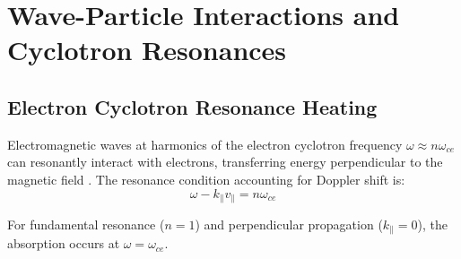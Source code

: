 \documentclass[11pt,a4paper]{article}
\begin{document}
\section{Wave-Particle Interactions and Cyclotron Resonances}

\subsection{Electron Cyclotron Resonance Heating}

Electromagnetic waves at harmonics of the electron cyclotron frequency $\omega \approx n\omega_{ce}$ can resonantly interact with electrons, transferring energy perpendicular to the magnetic field \cite{Swanson2003}. The resonance condition accounting for Doppler shift is:
\begin{equation}
\omega - k_\parallel v_\parallel = n\omega_{ce}
\end{equation}

For fundamental resonance ($n=1$) and perpendicular propagation ($k_\parallel = 0$), the absorption occurs at $\omega = \omega_{ce}$.
\end{document}

